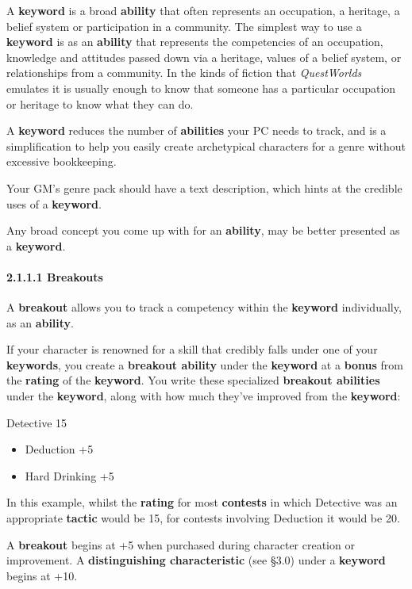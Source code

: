 \documentclass[
  11pt,
]{article}
\providecommand{\tightlist}{%
  \setlength{\itemsep}{0pt}\setlength{\parskip}{0pt}}
\begin{document}
A \textbf{keyword} is a broad \textbf{ability} that often represents an
occupation, a heritage, a belief system or participation in a community.
The simplest way to use a \textbf{keyword} is as an \textbf{ability}
that represents the competencies of an occupation, knowledge and
attitudes passed down via a heritage, values of a belief system, or
relationships from a community. In the kinds of fiction that
\emph{QuestWorlds} emulates it is usually enough to know that someone
has a particular occupation or heritage to know what they can do.

A \textbf{keyword} reduces the number of \textbf{abilities} your PC
needs to track, and is a simplification to help you easily create
archetypical characters for a genre without excessive bookkeeping.

Your GM's genre pack should have a text description, which hints at the
credible uses of a \textbf{keyword}.

Any broad concept you come up with for an \textbf{ability}, may be
better presented as a \textbf{keyword}.

\hypertarget{breakouts}{%
\paragraph{2.1.1.1 Breakouts}\label{breakouts}}

A \textbf{breakout} allows you to track a competency within the
\textbf{keyword} individually, as an \textbf{ability}.

If your character is renowned for a skill that credibly falls under one
of your \textbf{keywords}, you create a \textbf{breakout ability} under
the \textbf{keyword} at a \textbf{bonus} from the \textbf{rating} of the
\textbf{keyword}. You write these specialized \textbf{breakout
abilities} under the \textbf{keyword}, along with how much they've
improved from the \textbf{keyword}:

Detective 15

\begin{itemize}
\tightlist
\item
  Deduction +5
\item
  Hard Drinking +5
\end{itemize}

In this example, whilst the \textbf{rating} for most \textbf{contests}
in which Detective was an appropriate \textbf{tactic} would be 15, for
contests involving Deduction it would be 20.

A \textbf{breakout} begins at +5 when purchased during character
creation or improvement. A \textbf{distinguishing characteristic} (see
§3.0) under a \textbf{keyword} begins at +10.
\end{document}
